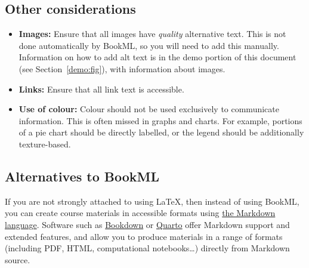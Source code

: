 \subsection{Other considerations}
\label{ssec:otheraccessibility}

\begin{itemize}
    \item \textbf{Images:} Ensure that all images have \textit{quality} alternative text. This is not done automatically by BookML, so you will need to add this manually. Information on how to add alt text is in the demo portion of this document (see Section~\ref{demo:fig}), with information about images.
    \item \textbf{Links:} Ensure that all link text is accessible.
    \item \textbf{Use of colour:} Colour should not be used exclusively to communicate information. This is often missed in graphs and charts. For example, portions of a pie chart should be directly labelled, or the legend should be additionally texture-based.
\end{itemize}

\subsection{Alternatives to BookML}
\label{ssec:alternatives}

If you are not strongly attached to using \LaTeX, then instead of using BookML, you can create course materials in accessible formats using \href{https://www.markdownguide.org/basic-syntax/}{the Markdown language}. Software such as \href{https://bookdown.org/}{Bookdown} or \href{https://quarto.org/}{Quarto} offer Markdown support and extended features, and allow you to produce materials in a range of formats (including PDF, HTML, computational notebooks\ldots) directly from Markdown source.


